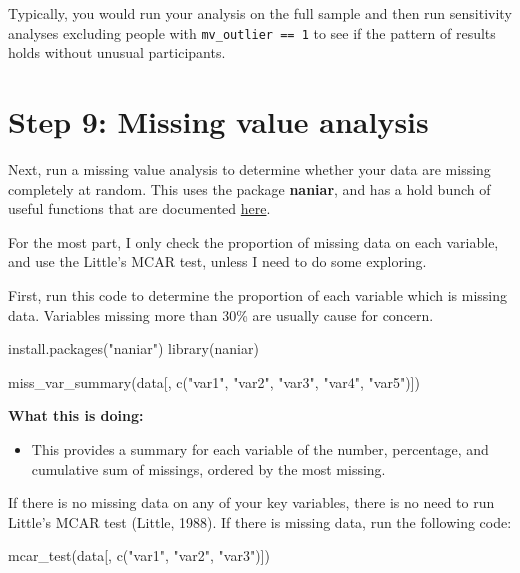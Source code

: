 \documentclass[
  letterpaper,
  DIV=11,
  numbers=noendperiod]{scrreprt}
\newenvironment{Shaded}{\begin{snugshade}}{\end{snugshade}}
\newcommand{\FunctionTok}[1]{\textcolor[rgb]{0.28,0.35,0.67}{#1}}
\newcommand{\NormalTok}[1]{\textcolor[rgb]{0.00,0.23,0.31}{#1}}
\newcommand{\StringTok}[1]{\textcolor[rgb]{0.13,0.47,0.30}{#1}}
\providecommand{\tightlist}{%
  \setlength{\itemsep}{0pt}\setlength{\parskip}{0pt}}\usepackage{longtable,booktabs,array}
\begin{document}
Typically, you would run your analysis on the full sample and then run
sensitivity analyses excluding people with \texttt{mv\_outlier\ ==\ 1}
to see if the pattern of results holds without unusual participants.

\section{Step 9: Missing value
analysis}\label{step-9-missing-value-analysis}

Next, run a missing value analysis to determine whether your data are
missing completely at random. This uses the package \textbf{naniar}, and
has a hold bunch of useful functions that are documented
\href{https://naniar.njtierney.com/}{here}.

For the most part, I only check the proportion of missing data on each
variable, and use the Little's MCAR test, unless I need to do some
exploring.

First, run this code to determine the proportion of each variable which
is missing data. Variables missing more than 30\% are usually cause for
concern.

\begin{Shaded}
\begin{Highlighting}[]
\FunctionTok{install.packages}\NormalTok{(}\StringTok{"naniar"}\NormalTok{)}
\FunctionTok{library}\NormalTok{(naniar)}

\FunctionTok{miss\_var\_summary}\NormalTok{(data[, }\FunctionTok{c}\NormalTok{(}\StringTok{"var1"}\NormalTok{, }\StringTok{"var2"}\NormalTok{, }\StringTok{"var3"}\NormalTok{, }\StringTok{"var4"}\NormalTok{, }\StringTok{"var5"}\NormalTok{)]) }
\end{Highlighting}
\end{Shaded}

\textbf{What this is doing:}

\begin{itemize}
\tightlist
\item
  This provides a summary for each variable of the number, percentage,
  and cumulative sum of missings, ordered by the most missing.
\end{itemize}

If there is no missing data on any of your key variables, there is no
need to run Little's MCAR test (Little, 1988). If there is missing data,
run the following code:

\begin{Shaded}
\begin{Highlighting}[]
\FunctionTok{mcar\_test}\NormalTok{(data[, }\FunctionTok{c}\NormalTok{(}\StringTok{"var1"}\NormalTok{, }\StringTok{"var2"}\NormalTok{, }\StringTok{"var3"}\NormalTok{)])}
\end{Highlighting}
\end{Shaded}
\end{document}
